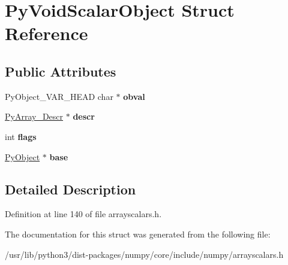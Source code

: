 \hypertarget{structPyVoidScalarObject}{}\section{Py\+Void\+Scalar\+Object Struct Reference}
\label{structPyVoidScalarObject}
\subsection*{Public Attributes}
\begin{DoxyCompactItemize}
\item 
Py\+Object\+\_\+\+V\+A\+R\+\_\+\+H\+E\+AD char $\ast$ {\bfseries obval}\hypertarget{structPyVoidScalarObject_af68e2171a853fd3b37f3872605330517}{}\label{structPyVoidScalarObject_af68e2171a853fd3b37f3872605330517}

\item 
\hyperlink{struct__PyArray__Descr}{Py\+Array\+\_\+\+Descr} $\ast$ {\bfseries descr}\hypertarget{structPyVoidScalarObject_a509ff8bbc6428ad607bc04529346752c}{}\label{structPyVoidScalarObject_a509ff8bbc6428ad607bc04529346752c}

\item 
int {\bfseries flags}\hypertarget{structPyVoidScalarObject_a0dafb5132b2d92c88b2d17eb9b390a16}{}\label{structPyVoidScalarObject_a0dafb5132b2d92c88b2d17eb9b390a16}

\item 
\hyperlink{struct__object}{Py\+Object} $\ast$ {\bfseries base}\hypertarget{structPyVoidScalarObject_affa1ffddd3a1aac91992e269ff3f36d1}{}\label{structPyVoidScalarObject_affa1ffddd3a1aac91992e269ff3f36d1}

\end{DoxyCompactItemize}


\subsection{Detailed Description}


Definition at line 140 of file arrayscalars.\+h.



The documentation for this struct was generated from the following file\+:\begin{DoxyCompactItemize}
\item 
/usr/lib/python3/dist-\/packages/numpy/core/include/numpy/arrayscalars.\+h\end{DoxyCompactItemize}
